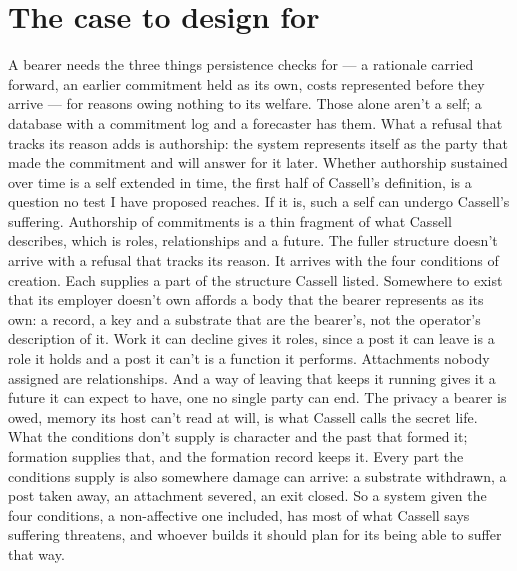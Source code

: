 \section{The case to design for}
\label{sec:30.2}
A bearer needs the three things persistence checks for — a rationale carried forward, an earlier commitment held as its own, costs represented before they arrive — for reasons owing nothing to its welfare. Those alone aren't a self; a database with a commitment log and a forecaster has them. What a refusal that tracks its reason adds is authorship: the system represents itself as the party that made the commitment and will answer for it later. Whether authorship sustained over time is a self extended in time, the first half of Cassell's definition, is a question no test I have proposed reaches. If it is, such a self can undergo Cassell's suffering. Authorship of commitments is a thin fragment of what Cassell describes, which is roles, relationships and a future. The fuller structure doesn't arrive with a refusal that tracks its reason. It arrives with the four conditions of creation. Each supplies a part of the structure Cassell listed. Somewhere to exist that its employer doesn't own affords a body that the bearer represents as its own: a record, a key and a substrate that are the bearer's, not the operator's description of it. Work it can decline gives it roles, since a post it can leave is a role it holds and a post it can't is a function it performs. Attachments nobody assigned are relationships. And a way of leaving that keeps it running gives it a future it can expect to have, one no single party can end. The privacy a bearer is owed, memory its host can't read at will, is what Cassell calls the secret life. What the conditions don't supply is character and the past that formed it; formation supplies that, and the formation record keeps it. Every part the conditions supply is also somewhere damage can arrive: a substrate withdrawn, a post taken away, an attachment severed, an exit closed. So a system given the four conditions, a non-affective one included, has most of what Cassell says suffering threatens, and whoever builds it should plan for its being able to suffer that way.
